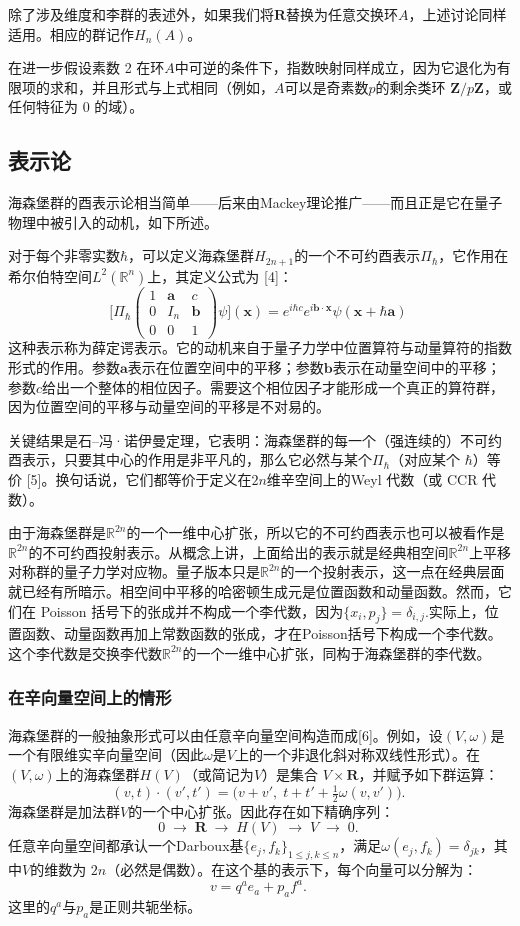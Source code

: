 除了涉及维度和李群的表述外，如果我们将$\mathbf{R}$替换为任意交换环$A$，上述讨论同样适用。相应的群记作$H_{n}(A)$。

在进一步假设素数 2 在环$A$中可逆的条件下，指数映射同样成立，因为它退化为有限项的求和，并且形式与上式相同（例如，$A$可以是奇素数$p$的剩余类环 $\mathbf{Z}/p\mathbf{Z}$，或任何特征为 0 的域）。
\subsection{表示论}
海森堡群的酉表示论相当简单——后来由Mackey理论推广——而且正是它在量子物理中被引入的动机，如下所述。

对于每个非零实数$\hbar$，可以定义海森堡群$H_{2n+1}$的一个不可约酉表示$\Pi_{\hbar}$，它作用在希尔伯特空间$L^{2}(\mathbb{R}^{n})$上，其定义公式为 [4]：
$$
\bigg[\Pi_{\hbar}
\begin{pmatrix}
1 & \mathbf{a} & c \\
0 & I_{n} & \mathbf{b} \\
0 & 0 & 1
\end{pmatrix}
\psi \bigg](\mathbf{x})
=
e^{i\hbar c} e^{i \mathbf{b}\cdot \mathbf{x}} \psi(\mathbf{x} + \hbar \mathbf{a})~
$$
这种表示称为薛定谔表示。它的动机来自于量子力学中位置算符与动量算符的指数形式的作用。参数$\mathbf{a}$表示在位置空间中的平移；参数$\mathbf{b}$表示在动量空间中的平移；参数$c$给出一个整体的相位因子。需要这个相位因子才能形成一个真正的算符群，因为位置空间的平移与动量空间的平移是不对易的。

关键结果是石–冯·诺伊曼定理，它表明：海森堡群的每一个（强连续的）不可约酉表示，只要其中心的作用是非平凡的，那么它必然与某个$\Pi_{\hbar}$（对应某个 $\hbar$）等价 [5]。换句话说，它们都等价于定义在$2n$维辛空间上的Weyl 代数（或 CCR 代数）。

由于海森堡群是$\mathbb{R}^{2n}$的一个一维中心扩张，所以它的不可约酉表示也可以被看作是$\mathbb{R}^{2n}$的不可约酉投射表示。从概念上讲，上面给出的表示就是经典相空间$\mathbb{R}^{2n}$上平移对称群的量子力学对应物。量子版本只是$\mathbb{R}^{2n}$的一个投射表示，这一点在经典层面就已经有所暗示。相空间中平移的哈密顿生成元是位置函数和动量函数。然而，它们在 Poisson 括号下的张成并不构成一个李代数，因为$\{x_{i}, p_{j}\} = \delta_{i,j}$.实际上，位置函数、动量函数再加上常数函数的张成，才在Poisson括号下构成一个李代数。这个李代数是交换李代数$\mathbb{R}^{2n}$的一个一维中心扩张，同构于海森堡群的李代数。
\subsubsection{在辛向量空间上的情形}
海森堡群的一般抽象形式可以由任意辛向量空间构造而成[6]。例如，设$(V, \omega)$是一个有限维实辛向量空间（因此$\omega$是$V$上的一个非退化斜对称双线性形式）。在$(V, \omega)$上的海森堡群$H(V)$（或简记为$V$）是集合 $V \times \mathbf{R}$，并赋予如下群运算：
$$
(v, t) \cdot (v', t') = \big(v + v', \; t + t' + \tfrac{1}{2}\omega(v, v')\big).~
$$
海森堡群是加法群$V$的一个中心扩张。因此存在如下精确序列：
$$
0 \;\longrightarrow\; \mathbf{R} \;\longrightarrow\; H(V) \;\longrightarrow\; V \;\longrightarrow\; 0.~
$$
任意辛向量空间都承认一个Darboux基$\{e_{j}, f_{k}\}_{1 \le j,k \le n}$，满足$\omega(e_{j}, f_{k}) = \delta_{jk}$，其中$V$的维数为 $2n$（必然是偶数）。在这个基的表示下，每个向量可以分解为：
$$
v = q^{a} e_{a} + p_{a} f^{a}.~
$$
这里的$q^{a}$与$p_{a}$是正则共轭坐标。

